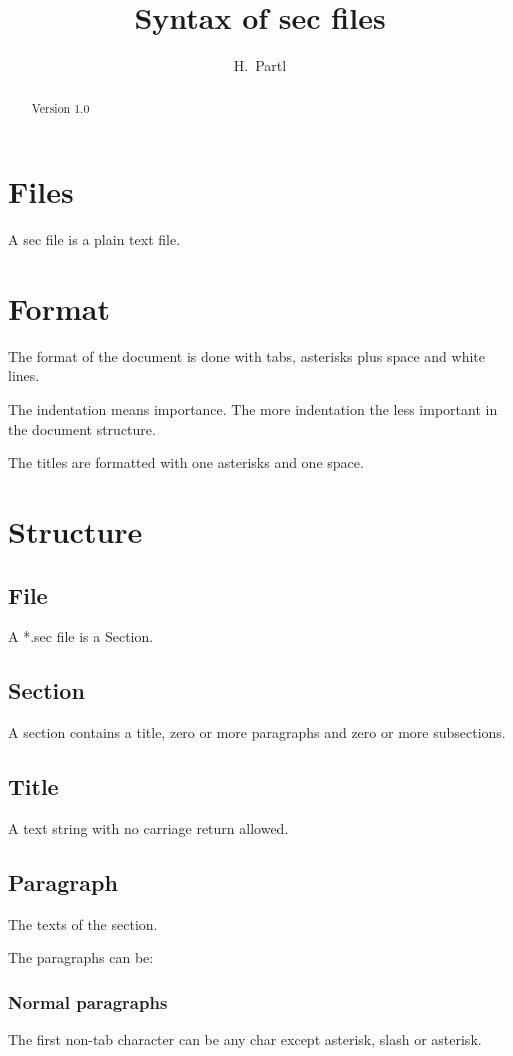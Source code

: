 \documentclass[a4paper,11pt]{article}
\author{H.~Partl}
\title{Syntax of sec files}
\begin{document}
\maketitle
\tableofcontents
\begin{abstract}
Version 1.0

\end{abstract}
\section{Files}
A sec file is a plain text file.

\section{Format}
The format of the document is done with tabs, asterisks plus space and
white lines.

The indentation means importance. The more indentation the less 
important in the document structure.

The titles are formatted with one asterisks and one space.

\section{Structure}
\subsection{File}
A *.sec file is a Section.

\subsection{Section}
A section contains a title, zero or more paragraphs and zero or 
more subsections.

\subsection{Title}
A text string with no carriage return allowed.

\subsection{Paragraph}
The texts of the section.

The paragraphs can be:

\subsubsection{Normal paragraphs}
The first non-tab character can be any char except 
asterisk, slash or asterisk.
\end{document}

